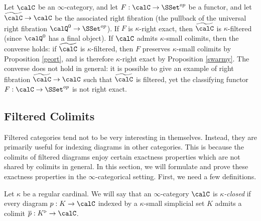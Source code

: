 \begin{remark}
Let $\calC$ be an $\infty$-category, and let $F: \calC \rightarrow \SSet^{op}$ be a functor, and let $\widetilde{\calC} \rightarrow \calC$ be the associated right fibration (the pullback of the universal right fibration $\calQ^0 \rightarrow \SSet^{op}$). If $F$ is $\kappa$-right exact, then
$\widetilde{\calC}$ is $\kappa$-filtered (since $\calQ^0$ has a final object). If
$\calC$ admits $\kappa$-small colimits, then the converse holds: if
$\widetilde{\calC}$ is $\kappa$-filtered, then $F$ preserves $\kappa$-small colimits by
Proposition \ref{geort}, and is therefore $\kappa$-right exact by Proposition \ref{swarmy}.
The converse does not hold in general: it is possible to give an example of right fibration
$\widetilde{\calC} \rightarrow \calC$ such that $\widetilde{\calC}$ is filtered, yet the classifying functor $F: \calC \rightarrow \SSet^{op}$ is not right exact.
\end{remark}

\subsection{Filtered Colimits}\label{fcolm}

Filtered categories tend not to be very interesting in themselves. Instead, they are primarily useful for indexing diagrams in other categories. 
This is because the colimits of filtered diagrams enjoy certain exactness properties which are not shared by colimits in general. In this section, we will formulate and prove these exactness properties in the $\infty$-categorical setting. First, we need a few definitions.

\begin{definition}\label{bicard}
Let $\kappa$ be a regular cardinal. We will say that an
$\infty$-category $\calC$ is {\it $\kappa$-closed} if every diagram
$p: K \rightarrow \calC$ indexed by a $\kappa$-small simplicial set $K$
admits a colimit $\overline{p}: K^{\triangleright} \rightarrow \calC$.
\end{definition}

